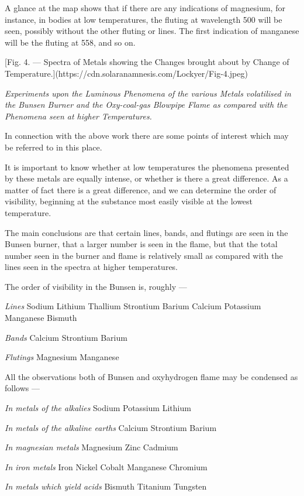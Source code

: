 \documentclass[a4paper, 12pt, oneside, polutonikogreek, english]{article}
\begin{document}
A glance at the map shows that if there are any indications of magnesium, for instance, in bodies at low temperatures, the fluting at wavelength 500 will be seen, possibly without the other fluting or lines. The first indication of manganese will be the fluting at 558, and so on.

[Fig. 4. --- Spectra of Metals showing the Changes brought about by Change of Temperature.](https://cdn.solaranamnesis.com/Lockyer/Fig-4.jpeg)

\emph{Experiments upon the Luminous Phenomena of the various Metals volatilised in the Bunsen Burner and the Oxy-coal-gas Blowpipe Flame as compared with the Phenomena seen at higher Temperatures.}

In connection with the above work there are some points of interest which may be referred to in this place.

It is important to know whether at low temperatures the phenomena presented by these metals are equally intense, or whether is there a great difference. As a matter of fact there is a great difference, and we can determine the order of visibility, beginning at the substance most easily visible at the lowest temperature.

The main conclusions are that certain lines, bands, and flutings are seen in the Bunsen burner, that a larger number is seen in the flame, but that the total number seen in the burner and flame is relatively small as compared with the lines seen in the spectra at higher temperatures.

The order of visibility in the Bunsen is, roughly ---

\emph{Lines} 
Sodium 
Lithium 
Thallium 
Strontium 
Barium 
Calcium 
Potassium 
Manganese 
Bismuth 

\emph{Bands} 
Calcium 
Strontium 
Barium 

\emph{Flutings} 
Magnesium 
Manganese 

All the observations both of Bunsen and oxyhydrogen flame may be condensed as follows ---

\emph{In metals of the alkalies} 
Sodium 
Potassium 
Lithium 

\emph{In metals of the alkaline earths} 
Calcium 
Strontium 
Barium 

\emph{In magnesian metals} 
Magnesium 
Zinc 
Cadmium 

\emph{In iron metals} 
Iron 
Nickel 
Cobalt 
Manganese 
Chromium 

\emph{In metals which yield acids} 
Bismuth 
Titanium 
Tungsten 
\end{document}

